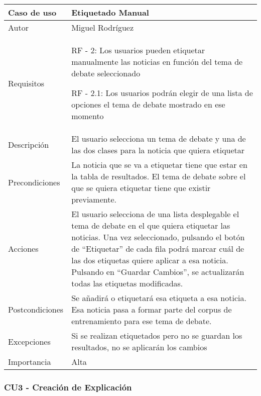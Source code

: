 \begin{center}
\begin{tabular}{ | m{3cm} | m{10cm}| } 
\hline
Caso de uso & Etiquetado Manual \\ 
\hline
Autor & Miguel Rodríguez \\ 
\hline
Requisitos & RF - 2: Los usuarios pueden etiquetar manualmente las noticias en función del tema de debate seleccionado

RF - 2.1: Los usuarios podrán elegir de una lista de opciones el tema de debate mostrado en ese momento \\ 
\hline
Descripción & El usuario selecciona un tema de debate y una de las dos clases para la noticia que quiera etiquetar \\
\hline
Precondiciones & La noticia que se va a etiquetar tiene que estar en la tabla de resultados. El tema de debate sobre el que se quiera etiquetar tiene que existir previamente. \\
\hline
Acciones & El usuario selecciona de una lista desplegable el tema de debate en el que quiera etiquetar las noticias. Una vez seleccionado, pulsando el botón de ``Etiquetar'' de cada fila podrá marcar cuál de las dos etiquetas quiere aplicar a esa noticia. Pulsando en ``Guardar Cambios'', se actualizarán todas las etiquetas modificadas. \\
\hline
Postcondiciones & Se añadirá o etiquetará esa etiqueta a esa noticia. Esa noticia pasa a formar parte del corpus de entrenamiento para ese tema de debate. \\
\hline
Excepciones & Si se realizan etiquetados pero no se guardan los resultados, no se aplicarán los cambios \\
\hline 
Importancia & Alta \\
\hline 
\end{tabular}
\end{center}

\subsubsection{CU3 - Creación de Explicación}

